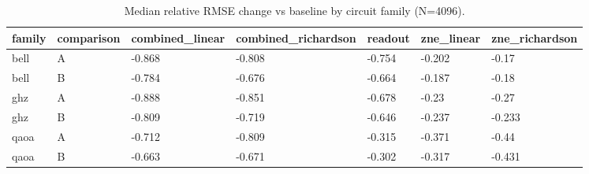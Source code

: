 \begin{table}[t]
\centering
\small
\caption{Median relative RMSE change vs baseline by circuit family (N=4096).}
\label{tab:family}
\begin{tabular}{lllllll}
\toprule
family & comparison & combined\_linear & combined\_richardson & readout & zne\_linear & zne\_richardson \\
\midrule
bell & A & -0.868 & -0.808 & -0.754 & -0.202 & -0.17 \\
bell & B & -0.784 & -0.676 & -0.664 & -0.187 & -0.18 \\
ghz & A & -0.888 & -0.851 & -0.678 & -0.23 & -0.27 \\
ghz & B & -0.809 & -0.719 & -0.646 & -0.237 & -0.233 \\
qaoa & A & -0.712 & -0.809 & -0.315 & -0.371 & -0.44 \\
qaoa & B & -0.663 & -0.671 & -0.302 & -0.317 & -0.431 \\
\bottomrule
\end{tabular}
\end{table}
